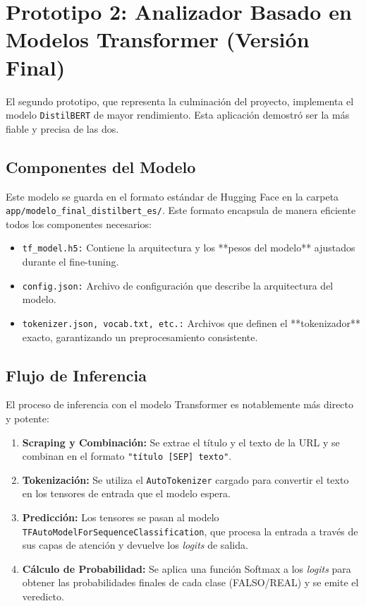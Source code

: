 \section{Prototipo 2: Analizador Basado en Modelos Transformer (Versión Final)}
El segundo prototipo, que representa la culminación del proyecto, implementa el modelo \texttt{DistilBERT} de mayor rendimiento. Esta aplicación demostró ser la más fiable y precisa de las dos.

\subsection{Componentes del Modelo}
Este modelo se guarda en el formato estándar de Hugging Face en la carpeta \texttt{app/modelo\_final\_distilbert\_es/}. Este formato encapsula de manera eficiente todos los componentes necesarios:
\begin{itemize}
    \item \texttt{tf\_model.h5:} Contiene la arquitectura y los **pesos del modelo** ajustados durante el fine-tuning.
    \item \texttt{config.json:} Archivo de configuración que describe la arquitectura del modelo.
    \item \texttt{tokenizer.json, vocab.txt, etc.:} Archivos que definen el **tokenizador** exacto, garantizando un preprocesamiento consistente.
\end{itemize}

\subsection{Flujo de Inferencia}
El proceso de inferencia con el modelo Transformer es notablemente más directo y potente:
\begin{enumerate}
    \item \textbf{Scraping y Combinación:} Se extrae el título y el texto de la URL y se combinan en el formato \texttt{"título [SEP] texto"}.
    \item \textbf{Tokenización:} Se utiliza el \texttt{AutoTokenizer} cargado para convertir el texto en los tensores de entrada que el modelo espera.
    \item \textbf{Predicción:} Los tensores se pasan al modelo \texttt{TFAutoModelForSequenceClassification}, que procesa la entrada a través de sus capas de atención y devuelve los \textit{logits} de salida.
    \item \textbf{Cálculo de Probabilidad:} Se aplica una función Softmax a los \textit{logits} para obtener las probabilidades finales de cada clase (FALSO/REAL) y se emite el veredicto.
\end{enumerate}

